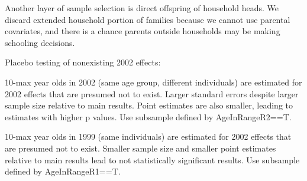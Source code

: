 Another layer of sample selection is direct offspring of household heads. We discard extended household portion of families because we cannot use parental covariates, and there is a chance parents outside households may be making schooling decisions.

Placebo testing of nonexisting 2002 effects:
\begin{description}
\vspace{1.0ex}\setlength{\itemsep}{1.0ex}\setlength{\baselineskip}{12pt}
\item[Same age group]	10-max year olds in 2002 (same age group, different individuals) are estimated for 2002 effects that are presumed not to exist. Larger standard errors despite larger sample size relative to main results. Point estimates are also smaller, leading to estimates with higher p values. Use subsample defined by \textsf{AgeInRangeR2==T}.
\item[Same individuals]	10-max year olds in 1999 (same individuals) are estimated for 2002 effects that are presumed not to exist. Smaller sample size and smaller point estimates relative to main results lead to not statistically significant results. Use subsample defined by \textsf{AgeInRangeR1==T}.
\end{description}

